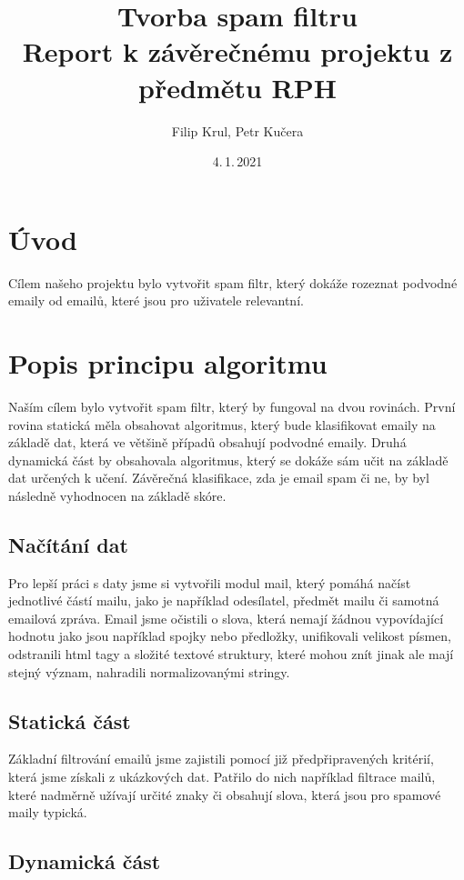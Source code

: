 \documentclass[12pt]{article}
\title{
    Tvorba spam filtru \\
    \large Report k závěrečnému projektu z předmětu RPH \\
    }
\author{Filip Krul, Petr Kučera}
\date{4.\,1.\,2021}
\begin{document}
\maketitle

\section{Úvod}\label{kapitola}

Cílem našeho projektu bylo vytvořit spam filtr, který dokáže rozeznat podvodné emaily od emailů, které jsou pro uživatele relevantní.

\section{Popis principu algoritmu}

Naším cílem bylo vytvořit spam filtr, který by fungoval na dvou rovinách. První rovina statická měla obsahovat algoritmus, který bude klasifikovat emaily na základě dat, která ve většině případů obsahují podvodné emaily. Druhá dynamická část by obsahovala algoritmus, který se dokáže sám učit na základě dat určených k učení. Závěrečná klasifikace, zda je email spam či ne, by byl následně vyhodnocen na základě skóre.

\subsection{Načítání dat}

Pro lepší práci s daty jsme si vytvořili modul mail, který pomáhá načíst jednotlivé částí mailu, jako je například odesílatel, předmět mailu či samotná emailová zpráva. Email jsme očistili o slova, která nemají žádnou vypovídající hodnotu jako jsou například spojky nebo předložky, unifikovali velikost písmen, odstranili html tagy a složité textové struktury, které mohou znít jinak ale mají stejný význam, nahradili normalizovanými stringy.

\subsection{Statická část}

Základní filtrování emailů jsme zajistili pomocí již předpřipravených kritérií, která jsme získali z ukázkových dat. Patřilo do nich například filtrace mailů, které nadměrně užívají určité znaky či obsahují slova, která jsou pro spamové maily typická.

\subsection{Dynamická část}
\end{document}
